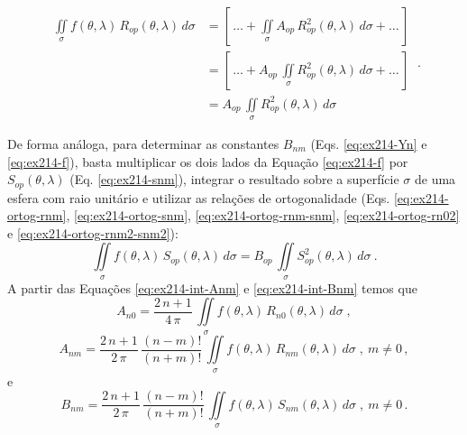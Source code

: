 \documentclass[10pt,a4paper,fleqn]{article}
\begin{document}
\begin{equation}
\begin{split}
\iint \limits_{\sigma} 
f(\theta,\lambda) \, R_{op}(\theta,\lambda) \, d \sigma
& = \left[ \, \hdots + 
\iint \limits_{\sigma} A_{op} \, R_{op}^{2}(\theta,\lambda) \, d \sigma
+ \hdots \, \right] \\
& = \left[ \, \hdots + 
A_{op} \, \iint \limits_{\sigma} R_{op}^{2}(\theta,\lambda) \, d \sigma
+ \hdots \, \right] \\
& = 
A_{op} \, \iint \limits_{\sigma} R_{op}^{2}(\theta,\lambda) \, d \sigma
\end{split} \: .
\label{eq:ex214-int-Anm}
\end{equation}

De forma an\'{a}loga, para determinar as constantes $B_{nm}$ (Eqs. \ref{eq:ex214-Yn} e \ref{eq:ex214-f}), basta multiplicar os 
dois lados da Equação \ref{eq:ex214-f} por $S_{op}(\theta,\lambda)$ (Eq. \ref{eq:ex214-snm}), integrar o resultado sobre a 
superf\'{i}cie $\sigma$ de uma esfera com raio unit\'{a}rio e utilizar as relaç\~{o}es de ortogonalidade 
(Eqs. \ref{eq:ex214-ortog-rnm}, \ref{eq:ex214-ortog-snm}, \ref{eq:ex214-ortog-rnm-snm}, \ref{eq:ex214-ortog-rn02} e 
\ref{eq:ex214-ortog-rnm2-snm2}):
\begin{equation}
\iint \limits_{\sigma} 
f(\theta,\lambda) \, S_{op}(\theta,\lambda) \, d \sigma
= B_{op} \, \iint \limits_{\sigma} S_{op}^{2}(\theta,\lambda) \, d \sigma \: .
\label{eq:ex214-int-Bnm}
\end{equation}
A partir das Equaç\~{o}es \ref{eq:ex214-int-Anm} e \ref{eq:ex214-int-Bnm} temos que
\begin{equation}
A_{n0} = \dfrac{2 \, n + 1}{4 \, \pi} \, 
\iint \limits_{\sigma} 
f(\theta,\lambda) \, R_{n0}(\theta,\lambda) \, d \sigma \; ,
\label{eq:ex214-An0}
\end{equation}
\begin{equation}
A_{nm} = \dfrac{2 \, n + 1}{2 \, \pi} \, \dfrac{(n - m)!}{(n + m)!} \,
\iint \limits_{\sigma} 
f(\theta,\lambda) \, R_{nm}(\theta,\lambda) \, d \sigma \; , \: m \neq 0 \, ,
\label{eq:ex214-Anm}
\end{equation}
e
\begin{equation}
B_{nm} = \dfrac{2 \, n + 1}{2 \, \pi} \, \dfrac{(n - m)!}{(n + m)!} \,
\iint \limits_{\sigma} 
f(\theta,\lambda) \, S_{nm}(\theta,\lambda) \, d \sigma \; , \: m \neq 0 \, .
\label{eq:ex214-Anm}
\end{equation}

\bigskip
\bigskip
\end{document}
